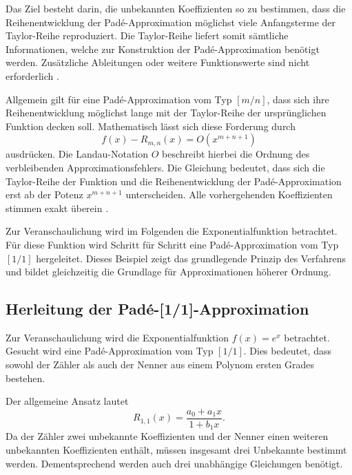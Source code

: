 Das Ziel besteht darin, die unbekannten Koeffizienten so zu bestimmen, dass die Reihenentwicklung der Padé-Approximation möglichst viele Anfangsterme der Taylor-Reihe reproduziert. Die Taylor-Reihe liefert somit sämtliche Informationen, welche zur Konstruktion der Padé-Approximation benötigt werden. Zusätzliche Ableitungen oder weitere Funktionswerte sind nicht erforderlich \cite{baker_graves_morris_1996}.

Allgemein gilt für eine Padé-Approximation vom Typ \([m/n]\), dass sich ihre Reihenentwicklung möglichst lange mit der Taylor-Reihe der ursprünglichen Funktion decken soll. Mathematisch lässt sich diese Forderung durch
\begin{equation*}
	f(x)-R_{m,n}(x)
	=
	O(x^{m+n+1})
\end{equation*}
ausdrücken. Die Landau-Notation \(O\) beschreibt hierbei die Ordnung des verbleibenden Approximationsfehlers. Die Gleichung bedeutet, dass sich die Taylor-Reihe der Funktion und die Reihenentwicklung der Padé-Approximation erst ab der Potenz \(x^{m+n+1}\) unterscheiden. Alle vorhergehenden Koeffizienten stimmen exakt überein \cite{baker_graves_morris_1996}.

Zur Veranschaulichung wird im Folgenden die Exponentialfunktion betrachtet. Für diese Funktion wird Schritt für Schritt eine Padé-Approximation vom Typ \([1/1]\) hergeleitet. Dieses Beispiel zeigt das grundlegende Prinzip des Verfahrens und bildet gleichzeitig die Grundlage für Approximationen höherer Ordnung.

\subsection{Herleitung der Padé-[1/1]-Approximation}
\label{pade:subsection:pade11}

Zur Veranschaulichung wird die Exponentialfunktion \(f(x)=e^x\) betrachtet. Gesucht wird eine Padé-Approximation vom Typ \([1/1]\). Dies bedeutet, dass sowohl der Zähler als auch der Nenner aus einem Polynom ersten Grades bestehen.

Der allgemeine Ansatz lautet
\begin{equation}
	R_{1,1}(x)
	=
	\frac{a_0+a_1x}{1+b_1x}.
	\label{pade:eq:pade11_ansatz}
\end{equation}
Da der Zähler zwei unbekannte Koeffizienten und der Nenner einen weiteren unbekannten Koeffizienten enthält, müssen insgesamt drei Unbekannte bestimmt werden. Dementsprechend werden auch drei unabhängige Gleichungen benötigt.

